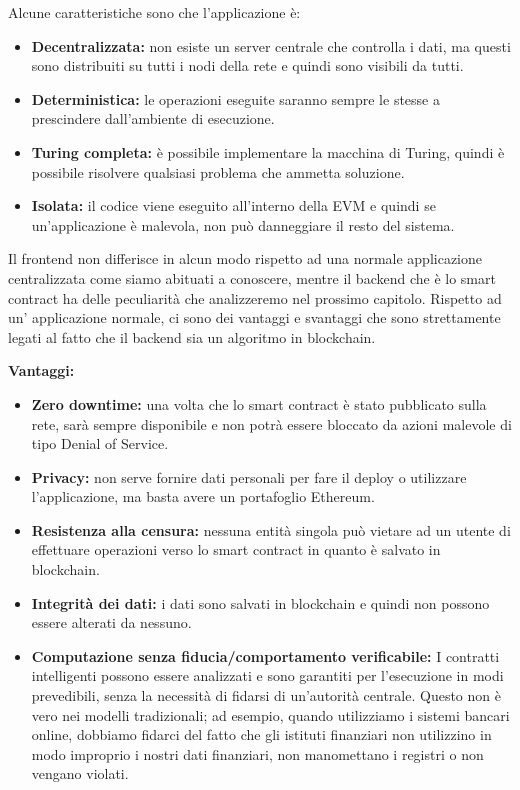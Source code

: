 Alcune caratteristiche sono che l'applicazione è:
\begin{itemize}
    \item \textbf{Decentralizzata:} non esiste un server centrale che
        controlla i dati, ma questi sono distribuiti su tutti i nodi della
        rete e quindi sono visibili da tutti.
    \item \textbf{Deterministica:} le operazioni eseguite saranno sempre le
        stesse a prescindere dall'ambiente di esecuzione.
    \item \textbf{Turing completa:} è possibile implementare la macchina di
        Turing, quindi è possibile risolvere qualsiasi problema che ammetta
        soluzione.
    \item \textbf{Isolata:} il codice viene eseguito all'interno della EVM e 
        quindi se un'applicazione è malevola, non può danneggiare il resto del
        sistema.
\end{itemize}

\newpage

Il frontend non differisce in alcun modo rispetto ad una normale applicazione
centralizzata come siamo abituati a conoscere, mentre il backend che è lo smart
contract ha delle peculiarità che analizzeremo nel prossimo capitolo.
Rispetto ad un' applicazione normale, ci sono dei vantaggi e svantaggi che sono
strettamente legati al fatto che il backend sia un algoritmo in blockchain.

\textbf{Vantaggi:}
\begin{itemize}
    \item \textbf{Zero downtime:} una volta che lo smart contract è stato 
        pubblicato sulla rete, sarà sempre disponibile e non potrà essere 
        bloccato da azioni malevole di tipo Denial of Service.
    \item \textbf{Privacy:} non serve fornire dati personali per fare il deploy
        o utilizzare l'applicazione, ma basta avere un portafoglio Ethereum.
    \item \textbf{Resistenza alla censura:} nessuna entità singola può vietare
        ad un utente di effettuare operazioni verso lo smart contract in quanto
        è salvato in blockchain.
    \item \textbf{Integrità dei dati:} i dati sono salvati in blockchain e
        quindi non possono essere alterati da nessuno.
    \item \textbf{Computazione senza fiducia/comportamento verificabile:} I
        contratti intelligenti possono essere analizzati e sono garantiti per
        l'esecuzione in modi prevedibili, senza la necessità di fidarsi di
        un'autorità centrale. Questo non è vero nei modelli tradizionali; ad
        esempio, quando utilizziamo i sistemi bancari online, dobbiamo fidarci
        del fatto che gli istituti finanziari non utilizzino in modo improprio
        i nostri dati finanziari, non manomettano i registri o non vengano
        violati.
\end{itemize}

